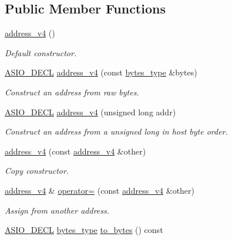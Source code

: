 \subsection*{Public Member Functions}
\begin{DoxyCompactItemize}
\item 
\hyperlink{classasio_1_1ip_1_1address__v4_a476f4efca2a71b7c578d7ed83ca7d271}{address\+\_\+v4} ()
\begin{DoxyCompactList}\small\item\em Default constructor. \end{DoxyCompactList}\item 
\hyperlink{config_8hpp_ab54d01ea04afeb9a8b39cfac467656b7}{A\+S\+I\+O\+\_\+\+D\+E\+C\+L} \hyperlink{classasio_1_1ip_1_1address__v4_af1e75fd90db9f8e21308377151561d99}{address\+\_\+v4} (const \hyperlink{classasio_1_1ip_1_1address__v4_a215b307474a39b561a7dd9be3e7a99ad}{bytes\+\_\+type} \&bytes)
\begin{DoxyCompactList}\small\item\em Construct an address from raw bytes. \end{DoxyCompactList}\item 
\hyperlink{config_8hpp_ab54d01ea04afeb9a8b39cfac467656b7}{A\+S\+I\+O\+\_\+\+D\+E\+C\+L} \hyperlink{classasio_1_1ip_1_1address__v4_aa3921c68ffdd594c7f28a95a2d0c7f1b}{address\+\_\+v4} (unsigned long addr)
\begin{DoxyCompactList}\small\item\em Construct an address from a unsigned long in host byte order. \end{DoxyCompactList}\item 
\hyperlink{classasio_1_1ip_1_1address__v4_a4005348efaf8c753e8dbd04e77a89b89}{address\+\_\+v4} (const \hyperlink{classasio_1_1ip_1_1address__v4}{address\+\_\+v4} \&other)
\begin{DoxyCompactList}\small\item\em Copy constructor. \end{DoxyCompactList}\item 
\hyperlink{classasio_1_1ip_1_1address__v4}{address\+\_\+v4} \& \hyperlink{classasio_1_1ip_1_1address__v4_a43ea9ea5f63f2a0e79e2330050ed4cbd}{operator=} (const \hyperlink{classasio_1_1ip_1_1address__v4}{address\+\_\+v4} \&other)
\begin{DoxyCompactList}\small\item\em Assign from another address. \end{DoxyCompactList}\item 
\hyperlink{config_8hpp_ab54d01ea04afeb9a8b39cfac467656b7}{A\+S\+I\+O\+\_\+\+D\+E\+C\+L} \hyperlink{classasio_1_1ip_1_1address__v4_a215b307474a39b561a7dd9be3e7a99ad}{bytes\+\_\+type} \hyperlink{classasio_1_1ip_1_1address__v4_a10794b695e7f2d27675570cde8fdf27d}{to\+\_\+bytes} () const 

\end{DoxyCompactItemize}
